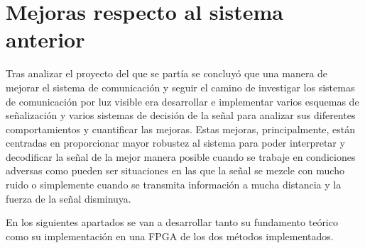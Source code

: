 \section{Mejoras respecto al sistema anterior}
Tras analizar el proyecto del que se partía se concluyó que una manera de mejorar el 
sistema de comunicación y seguir el camino de investigar los sistemas de comunicación por 
luz visible era desarrollar e implementar varios esquemas de señalización y varios sistemas
de decisión de la señal para analizar sus diferentes comportamientos y cuantificar las 
mejoras. Estas mejoras, principalmente, están centradas en proporcionar mayor robustez al 
sistema para poder interpretar y decodificar la señal de la mejor manera posible cuando
se trabaje en condiciones adversas como pueden ser situaciones en las que la señal se 
mezcle con mucho ruido o simplemente cuando se transmita información a mucha distancia y 
la fuerza de la señal disminuya.

En los siguientes apartados se van a desarrollar tanto su fundamento teórico como su 
implementación en una FPGA de los dos métodos implementados.

\chapterend{}

